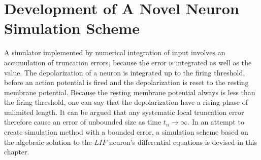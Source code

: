\documentclass[b5paper,11 pt]{report}
\begin{document}
\chapter{Development of A Novel Neuron Simulation Scheme}

A simulator implemented by numerical integration of input involves an accumulation of truncation errors, because the error is integrated as well as the value.
The depolarization of a neuron is integrated up to the firing threshold, before an action potential is fired and the depolarization is reset to the resting membrane potential.
Because the resting membrane potential always is less than the firing threshold, one can say that the depolarization have a rising phase of unlimited length. %
It can be argued that any systematic local truncation error therefore cause an error of unbounded size as time $t_n\to\infty$.
In an attempt to create simulation method with a bounded error, a simulation scheme based on the algebraic solution to the $LIF$ neuron's differential equations is devised in this chapter.
\end{document}
